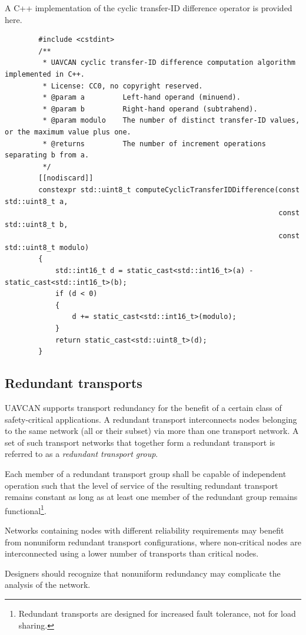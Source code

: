 \begin{remark}
    A C++ implementation of the cyclic transfer-ID difference operator is provided here.
    \begin{verbatim}
        #include <cstdint>
        /**
         * UAVCAN cyclic transfer-ID difference computation algorithm implemented in C++.
         * License: CC0, no copyright reserved.
         * @param a         Left-hand operand (minuend).
         * @param b         Right-hand operand (subtrahend).
         * @param modulo    The number of distinct transfer-ID values, or the maximum value plus one.
         * @returns         The number of increment operations separating b from a.
         */
        [[nodiscard]]
        constexpr std::uint8_t computeCyclicTransferIDDifference(const std::uint8_t a,
                                                                 const std::uint8_t b,
                                                                 const std::uint8_t modulo)
        {
            std::int16_t d = static_cast<std::int16_t>(a) - static_cast<std::int16_t>(b);
            if (d < 0)
            {
                d += static_cast<std::int16_t>(modulo);
            }
            return static_cast<std::uint8_t>(d);
        }
    \end{verbatim}
\end{remark}

\subsection{Redundant transports}

UAVCAN supports transport redundancy for the benefit of a certain class of safety-critical applications.
A redundant transport interconnects nodes belonging to the same network (all or their subset)
via more than one transport network.
A set of such transport networks that together form a redundant transport is referred to as a
\emph{redundant transport group}.

Each member of a redundant transport group shall be capable of independent operation
such that the level of service of the resulting redundant transport remains constant
as long as at least one member of the redundant group remains functional\footnote{%
    Redundant transports are designed for increased fault tolerance, not for load sharing.
}.

\begin{remark}
    Networks containing nodes with different reliability requirements may benefit from
    nonuniform redundant transport configurations, where non-critical nodes are interconnected
    using a lower number of transports than critical nodes.

    Designers should recognize that nonuniform redundancy may complicate the analysis of the network.
\end{remark}

